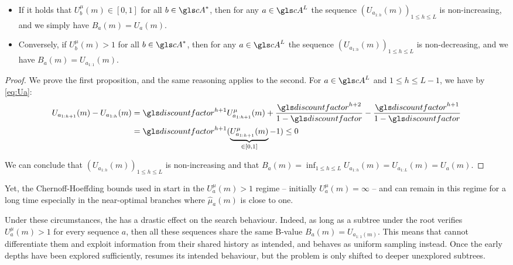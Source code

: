 \begin{lemma}
	\label{lemma:seq_values}
	\begin{leftbar}[lemmabar]
	\leavevmode\newline
	\begin{itemize}
	\item If it holds that $U^{\mu}_b(m) \in [0, 1]$ for all $b\in \cA^{\ast}$, then for any $a\in \cA^L$ the sequence $(U_{a_{1:h}}(m))_{1\leq h \leq L}$ is non-increasing, and we simply have $B_a(m) = U_a(m)$.
	\item Conversely, if $U^{\mu}_b(m) > 1$ for all $b\in \cA^{\ast}$, then for any $a\in \cA^L$ the sequence $(U_{a_{1:h}}(m))_{1\leq h \leq L}$ is non-decreasing, and we have $B_a(m) = U_{a_{1:1}}(m)$.
	\end{itemize}
	\end{leftbar}
\end{lemma}

\begin{proof}
	We prove the first proposition, and the same reasoning applies to the second. For $a\in \cA^L$ and $1 \leq h \leq L - 1$, we have by \eqref{eq:Ua}:
	\begin{align*}
	U_{a_{1:h+1}}(m) - U_{a_{1:h}}(m) &= \discount^{h+1}U^{\mu}_{a_{1:h+1}}(m) + \frac{\discount^{h+2}}{1-\discount} - \frac{\discount^{h+1}}{1-\discount}\\
	&= \discount^{h+1}(\underbrace{U^{\mu}_{a_{1:h+1}}(m)}_{\in [0, 1]} - 1) \leq 0
	\end{align*}
	
	\noindent
	We can conclude that $(U_{a_{1:h}}(m))_{1\leq h \leq L}$ is non-increasing and that $B_a(m) = \inf_{1 \leq h \leq L} U_{a_{1:h}}(m) = U_{a_{1:L}}(m) = U_a(m)$.
\end{proof}

Yet, the Chernoff-Hoeffding bounds used in \OLOP start in the $U^{\mu}_a(m) > 1$ regime -- initially $U^{\mu}_a(m) = \infty$ -- and can remain in this regime for a long time especially in the near-optimal branches where $\hat{\mu}_a(m)$ is close to one.

Under these circumstances, the  has a drastic effect on the search behaviour. Indeed, as long as a subtree under the root verifies $U^{\mu}_a(m) > 1$ for every sequence $a$, then all these sequences share the same B-value $B_a(m) = U_{a_{1:1}(m)}$. This means that \OLOP cannot differentiate them and exploit information from their shared history as intended, and behaves as uniform sampling instead.
Once the early depths have been explored sufficiently, \OLOP resumes its intended behaviour, but the problem is only shifted to deeper unexplored subtrees.

